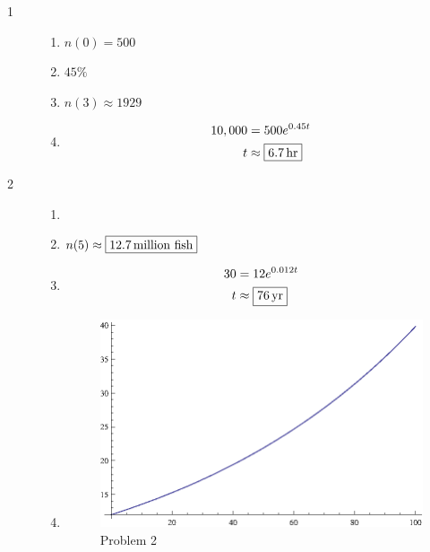\documentclass{exam}
\begin{document}
    \begin{description}

      \item[1]
        \begin{enumerate}[a]
          \item $n(0) = \boxed{500}$

          \item $\boxed{ 45\% }$

          \item $n(3) \approx \boxed{1929}$

          \item
            \begin{align*}
              10,000 & = 500 e^{0.45t} \\
              t      & \approx \boxed{\unit[6.7]{hr}} \\
            \end{align*}

        \end{enumerate}

      \item[2]
        \begin{enumerate}[a]

          \item {}

          \item $n(5) \approx \boxed{ \unit[12.7]{million\ fish}} $

          \item
            \begin{align*}
              30 & = 12 e^{0.012t} \\
              t      & \approx \boxed{\unit[76]{yr}} \\
            \end{align*}

          \item
            \begin{figure}[H]
              \centering
              \includegraphics{problem2.eps}
              \caption{Problem 2}
            \end{figure}
        \end{enumerate}


\end{description}
\end{document}
